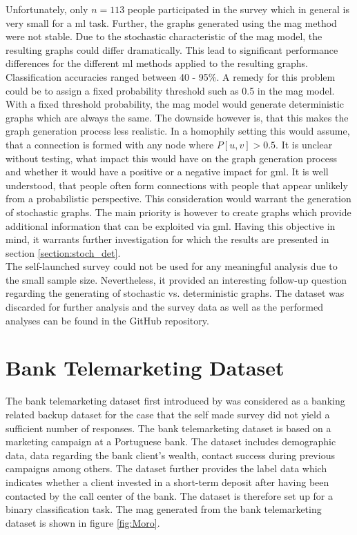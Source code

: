   \noindent Unfortunately, only $n=113$ people participated in the survey which 
  in general is very small for a \acs{ml} task. Further, the graphs generated 
  using the \acs{mag} method were not stable. Due to the stochastic
  characteristic of the \acs{mag} model, the resulting graphs could differ 
  dramatically. This lead to significant performance differences for the
  different \acs{ml} methods applied to the resulting graphs. Classification 
  accuracies ranged between 40 - 95\%. A remedy for this problem could be to 
  assign a fixed probability threshold such as 0.5 in the \acs{mag} model. With 
  a fixed threshold probability, the \acs{mag} model would generate deterministic 
  graphs which are always the same. The downside however is, that this makes the 
  graph generation process less realistic. In a homophily setting this would 
  assume, that a connection is formed with any node where $P[u,v]>0.5$. It is 
  unclear without testing, what impact this would have on the graph generation
  process and whether it would have a positive or a negative impact for \acs{gml}. 
  It is well understood, that people often form connections with people that appear 
  unlikely from a probabilistic perspective. This consideration would warrant the 
  generation of stochastic graphs. The main priority is however to create graphs 
  which provide additional information that can be exploited via \acs{gml}. 
  Having this objective in mind, it warrants further investigation for which the 
  results are presented in section \ref{section:stoch_det}. \\

  \noindent The self-launched survey could not be used for any meaningful
  analysis due to the small sample size. Nevertheless, it provided an
  interesting follow-up question regarding the generating of
  stochastic vs. deterministic graphs. The dataset was discarded for
  further analysis and the survey data as well as the performed analyses can be
  found in the GitHub repository. 

  \section{Bank Telemarketing Dataset}
  \label{section:bank_data}

  The bank telemarketing dataset first introduced by 
  \cite{moro2011using,moro2014data} was considered as a banking related backup 
  dataset for the case that the self made survey did not yield a sufficient 
  number of responses. The bank telemarketing dataset is based on a marketing 
  campaign at a Portuguese bank. The dataset includes demographic data, data 
  regarding the bank client's wealth, contact success during previous
  campaigns among others. The dataset further provides the label data which 
  indicates whether a client invested in a short-term deposit after having been 
  contacted by the call center of the bank. The dataset is therefore set up for 
  a binary classification task. The \acs{mag} generated from the bank 
  telemarketing dataset is shown in figure \ref{fig:Moro}.
 
